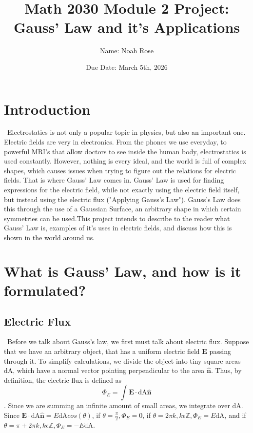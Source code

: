 \documentclass{report}
\title{Math 2030 Module 2 Project: Gauss' Law and it's Applications}
\author{Name: Noah Rose}
\date{Due Date: March 5th, 2026}
\begin{document}
\maketitle

\section{Introduction}
\ Electrostatics is not only a popular topic in physics, but also an important one. Electric fields are very in electronics. From the phones we use everyday, to powerful MRI's that allow doctors to see inside the human body, electrostatics is used constantly. However, nothing is every ideal, and the world is full of complex shapes, which causes issues when trying to figure out the relations for electric fields. That is where Gauss' Law comes in. Gauss' Law is used for finding expressions for the electric field, while not exactly using the electric field itself, but instead using the electric flux ("Applying Gauss's Law"). Gauss's Law does this through the use of a Gaussian Surface, an arbitrary shape in which certain symmetries can be used.This project intends to describe to the reader what Gauss' Law is, examples of it's uses in electric fields, and discuss how this is shown in the world around us. 
\section{What is Gauss' Law, and how is it formulated?}

\subsection{Electric Flux}
\ Before we talk about Gauss's law, we first must talk about electric flux. Suppose that we have an arbitrary object, that has a uniform electric field $\mathbf{E}$ passing through it. To simplify calculations, we divide the object into tiny square areas $\mathrm{dA}$, which have a normal vector pointing perpendicular to the area $\hat{\mathbf{n}}$. Thus, by definition, the electric flux is defined as $$\Phi_E=\int\mathbf{E}\cdot \mathrm{dA} \hat{\mathbf{n}} $$. Since we are summing an infinite amount of small areas, we integrate over $\mathrm{dA}$. Since $\mathbf{E}\cdot \mathrm{dA} \mathbf{\hat{n}} = E\mathrm{dA}cos(\theta)$, if $\theta=\frac{\pi}{2}, \Phi_E=0$, if $\theta=2\pi k, k\epsilon \mathbb{Z}, \Phi_E=E\mathrm{dA}$, and if $\theta = \pi+2\pi k, k\epsilon \mathbb{Z}, \Phi_E=-E\mathrm{dA}$.
\end{document}
